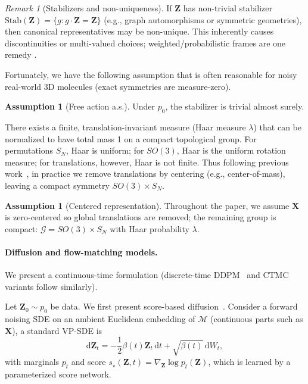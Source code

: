 \documentclass{article}
\theoremstyle{plain}
\theoremstyle{definition}
\newtheorem{assumption}[theorem]{Assumption}
\theoremstyle{remark}
\newtheorem{remark}[theorem]{Remark}
\newcommand{\1}{\mathbf{1}}
\newcommand{\Haar}{\lambda} %
\newcommand{\G}{\mathcal{G}}
\newcommand{\M}{\mathcal{M}}
\newcommand{\Z}{\mathbf{Z}}
\newcommand{\Xc}{\mathbf{X}}
\newcommand{\grad}{\nabla}
\newcommand{\acts}{\cdot} %
\begin{document}
\begin{remark}[Stabilizers and non-uniqueness]
If $\Z$ has non-trivial stabilizer $\mathrm{Stab}(\Z)=\{g:g\acts \Z=\Z\}$ (e.g., graph automorphisms or symmetric geometries), then canonical representatives may be non-unique. This inherently causes discontinuities or multi-valued choices; weighted/probabilistic frames are one remedy \cite{dym2024equivariant}.
\end{remark}
Fortunately, we have the following assumption that is often reasonable for noisy real-world 3D molecules (exact symmetries are measure-zero).

\begin{assumption}[Free action a.s.]\label{ass:free}
Under $p_0$, the stabilizer is trivial almost surely.
\end{assumption}

There exists a finite, translation-invariant measure (Haar measure $\lambda$) that can be normalized to have total mass 1 on a compact topological group.
For permutations $S_N$, Haar is uniform; for $SO(3)$, Haar is the uniform rotation measure; for translations, however, Haar is not finite. Thus following previous work~\citep{hoogeboom2022equivariant, li2024geometric}, in practice we remove translations by centering (e.g., center-of-mass), leaving a compact symmetry $SO(3)\times S_N$.

\begin{assumption}[Centered representation]\label{ass:center}
Throughout the paper, we assume $\Xc$ is zero-centered so global translations are removed; the remaining group is compact: $\G = SO(3)\times S_N$ with Haar probability $\Haar$.
\end{assumption}

\paragraph{Diffusion and flow-matching models.}
We present a continuous-time formulation (discrete-time DDPM~\citep{ho2020denoising} and CTMC variants follow similarly).

Let $\Z_0\sim p_0$ be data. We first present score-based diffusion~\citep{song2020score}. Consider a forward noising SDE on an ambient Euclidean embedding of $\M$ (continuous parts such as $\Xc$), a standard VP-SDE is
\begin{equation}
\mathrm{d}\Z_t = -\frac{1}{2}\beta(t)\Z_t\,\mathrm{d}t + \sqrt{\beta(t)}\,\mathrm{d}W_t,
\end{equation}
with marginals $p_t$ and score $s_\star(\Z,t)=\grad_{\Z}\log p_t(\Z)$, which is learned by a parameterized score network. 
\end{document}
